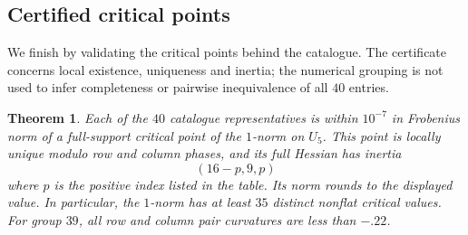 \documentclass[11pt,a4paper]{article}
\newtheorem{thm}{Theorem}[section]
\begin{document}
\subsection{Certified critical points}\label{criticalpoints}
We finish by validating the critical points behind the catalogue.
The certificate concerns local existence, uniqueness and inertia;
the numerical grouping is not used to infer completeness or pairwise
inequivalence of all $40$ entries.

\begin{thm}\label{criticalcatalogue}
Each of the $40$ catalogue representatives is within $10^{-7}$ in
Frobenius norm of a full-support critical point of the $1$-norm on $U_5$.
This point is locally unique modulo row and column phases, and its
full Hessian has inertia
\[
 (16-p,9,p)
\]
where $p$ is the positive index listed in the table. Its norm rounds
to the displayed value. In particular, the $1$-norm has at least $35$
distinct nonflat critical values. For group $39$, all row and column
pair curvatures are less than $-.22$.
\end{thm}
\end{document}
